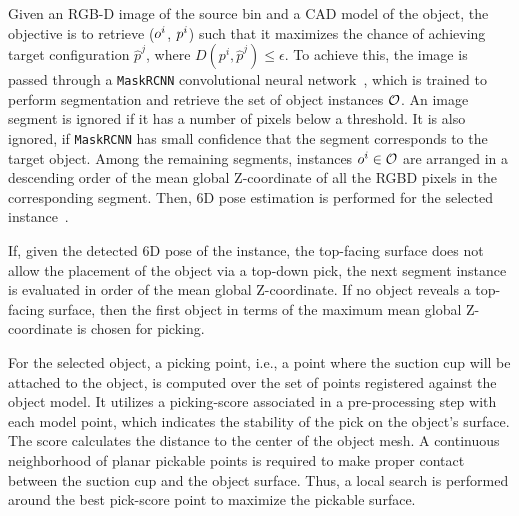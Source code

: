 Given an RGB-D image of the source bin and a CAD model of the object, the objective is to retrieve ($o^i$, $p^i$) such that it maximizes the chance of achieving target configuration $\hat{p}^j$, where $D(p^i,\hat{p}^j) \leq \epsilon$. To achieve this, the image is passed through a {\tt MaskRCNN} convolutional neural network~\cite{he2017mask}, which is trained to perform segmentation and retrieve the set of object instances $\mathcal{O}$.  An image segment is ignored if it has a number of pixels below a threshold. It is also ignored, if {\tt MaskRCNN} has small confidence that the segment corresponds to the target object. Among the remaining segments, instances $o^i \in \mathcal{O}$ are arranged in a descending order of the mean global Z-coordinate of all the RGBD pixels in the corresponding segment. Then, 6D pose estimation is performed for the selected instance~\cite{175}\cite{stocs}. 

If, given the detected 6D pose of the instance, the top-facing surface does not allow the placement of the object via a top-down pick, the next segment instance is evaluated in order of the mean global Z-coordinate. If no object reveals a top-facing surface, then the first object in terms of the maximum mean global Z-coordinate is chosen for picking. 

For the selected object, a picking point, i.e., a point where the suction cup will be attached to the object, is computed over the set of points registered against the object model. It utilizes a picking-score associated in a pre-processing step with each model point, which indicates the stability of the pick on the object's surface. The score calculates the distance to the center of the object mesh. A continuous neighborhood of planar pickable points is required to make proper contact between the suction cup and the object surface. Thus, a local search is performed around the best pick-score point to maximize the pickable surface.




